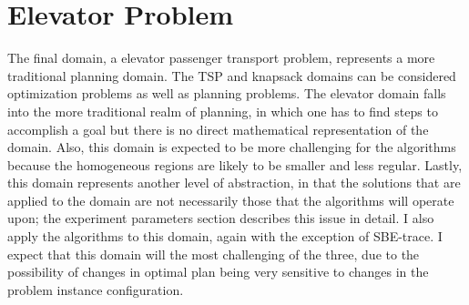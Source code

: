 





\section{Elevator Problem}

The final domain, a elevator passenger transport problem,  represents a more traditional planning domain.  The TSP and knapsack domains can be considered optimization problems as well as planning problems.  The elevator domain  falls into the more traditional realm of planning, in which one has to find steps to accomplish a goal but  there is no direct mathematical representation of the domain.  Also, this domain is expected to be more challenging for the algorithms because the homogeneous regions are likely to be smaller and less regular.  Lastly, this domain represents  another level of abstraction, in that the solutions that are applied to the domain are not necessarily those that the algorithms will operate upon; the experiment parameters section describes this issue in detail.  I also apply the algorithms to this domain, again with the exception of SBE-trace.  I expect that this domain will the most challenging of the three, due to the possibility of changes in optimal plan being very sensitive to changes in the problem instance configuration.



